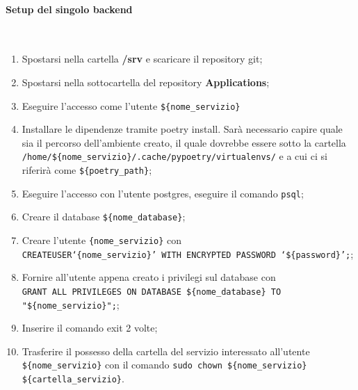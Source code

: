 \documentclass[11pt]{article} %
\begin{document}
\paragraph{Setup del singolo backend}\mbox{}\\
\begin{enumerate}
\item Spostarsi nella cartella \textbf{/srv} e scaricare il repository git;
\item Spostarsi nella sottocartella del repository \textbf{Applications};
\item Eseguire l'accesso come l'utente \verb|${nome_servizio}|
\item Installare le dipendenze tramite poetry install. Sarà necessario capire quale sia il percorso dell'ambiente creato, il quale dovrebbe essere sotto la cartella\\
\verb|/home/${nome_servizio}/.cache/pypoetry/virtualenvs/| e a cui ci si riferirà come \verb|${poetry_path}|;
\item Eseguire l'accesso con l'utente postgres, eseguire il comando \verb|psql|;
\item Creare il database \verb|${nome_database}|;
\item Creare l'utente \verb|{nome_servizio}| con\\
\verb|CREATEUSER‘{nome_servizio}’ WITH ENCRYPTED PASSWORD ‘${password}’;|;
\item Fornire all'utente appena creato i privilegi sul database con\\
\verb|GRANT ALL PRIVILEGES ON DATABASE ${nome_database} TO "${nome_servizio}";|;
\item Inserire il comando exit 2 volte;
\item Trasferire il possesso della cartella del servizio interessato all'utente \verb|${nome_servizio}| con il comando \verb|sudo chown ${nome_servizio} ${cartella_servizio}|.
\end{enumerate}
\end{document}
